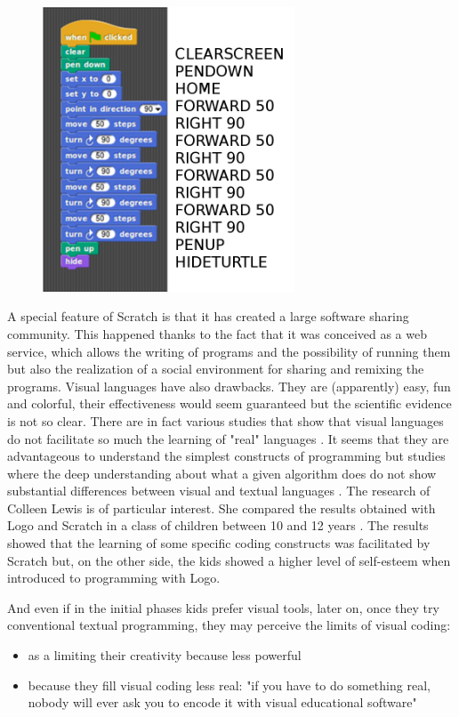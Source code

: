 \begin{figure}
   \centering
   \includegraphics[width=7.5cm]{./images/librelogo/scratch-2.png}
   \label{scratch}
\end{figure}

A special feature of Scratch is that it has created a large software sharing community. This happened thanks to the fact that it was conceived as a web service, which allows the writing of programs and the possibility of running them but also the realization of a social environment for sharing and remixing the programs. Visual languages have also drawbacks. They are (apparently) easy, fun and colorful, their effectiveness would seem guaranteed but the scientific evidence is not so clear. There are in fact various studies that show that visual languages do not facilitate so much the learning of "real" languages \cite{Weintrop}. It seems that they are advantageous to understand the simplest constructs of programming but studies where the deep understanding about what a given algorithm does do not show substantial differences between visual and textual languages \cite{Weintrop2}. The research of Colleen Lewis is of particular interest. She compared the results obtained with Logo and Scratch in a class of children between 10 and 12 years \cite{Lewis}. The results showed that the learning of some specific coding constructs was facilitated by Scratch but, on the other side, the kids showed a higher level of self-esteem when introduced to programming with Logo.    

And even if in the initial phases kids prefer visual tools, later on, once they try conventional textual programming, they may perceive the limits of visual coding:

\begin{itemize}
\item as a limiting their creativity because less powerful
\item because they fill visual coding less real: "if you have to do something real, nobody will ever ask you to encode it with visual educational software" \cite{Weintrop3}
\end{itemize}

